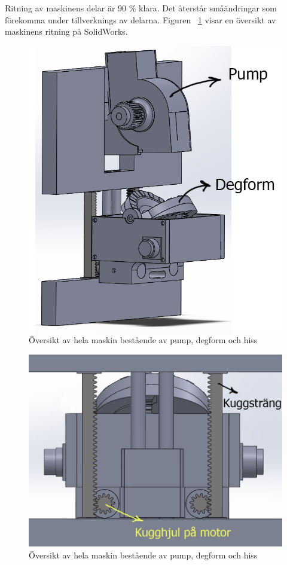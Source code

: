 Ritning av maskinens delar är 90 \% klara. Det återstår småändringar som förekomma under tillverknings av delarna. Figuren ~\ref{helmaskin} visar en översikt av maskinens ritning på SolidWorks.

\begin{figure}[h]
	\begin{center}
		\includegraphics[scale=0.75]{images/hela_maskin.png}
		\caption{Översikt av hela maskin bestående av pump, degform och hiss}
		\label{helmaskin}
	\end{center}
\end{figure}


\begin{figure}[h]
	\begin{center}
		\includegraphics[scale=0.75]{images/maskinBaksida.jpg}
		\caption{Översikt av hela maskin bestående av pump, degform och hiss}
		\label{helmaskinbaksida}
	\end{center}
\end{figure}
